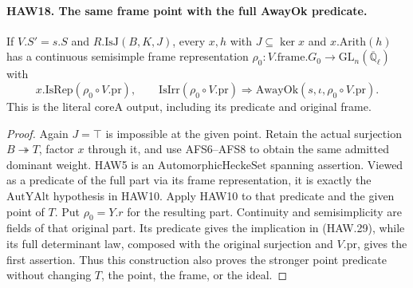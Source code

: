 \paragraph{HAW18. The same frame point with the full AwayOk predicate.}
\label{claim:HAW18}
If $V.S'=s.S$ and $R.\mathrm{IsJ}(B,K,J)$, every
$x,h$ with $J\subseteq\ker x$ and $x.\mathrm{Arith}(h)$
has a continuous semisimple frame representation
$\rho_0:V.\mathrm{frame}.G_0\to\mathrm{GL}_n
(\overline{\mathbb Q}_\ell)$ with
\[
 x.\mathrm{IsRep}(\rho_0\circ V.\mathrm{pr}),\qquad
 \mathrm{IsIrr}(\rho_0\circ V.\mathrm{pr})
       \Longrightarrow\mathrm{AwayOk}(s,\iota,
                                     \rho_0\circ V.\mathrm{pr}).
 \tag{HAW.29}
\]
This is the literal $\mathrm{coreA}$ output, including its
predicate and original frame.
\begin{proof}
Again $J=\top$ is impossible at the given point.  Retain
the actual surjection $B\twoheadrightarrow T$, factor
$x$ through it, and use AFS6--AFS8 to obtain the same
admitted dominant weight.  HAW5 is an
$\mathrm{AutomorphicHeckeSet}$ spanning assertion.  Viewed
as a predicate of the full part via its frame representation,
it is exactly the $\mathrm{AutYAlt}$ hypothesis in HAW10.
Apply HAW10 to that predicate and the given point of $T$.
Put $\rho_0=Y.r$ for the resulting part.  Continuity and
semisimplicity are fields of that original part.  Its
predicate gives the implication in (HAW.29), while its full
determinant law, composed with the original surjection and
$V.\mathrm{pr}$, gives the first assertion.  Thus this
construction also proves the stronger point predicate
without changing $T$, the point, the frame, or the ideal.
\end{proof}

